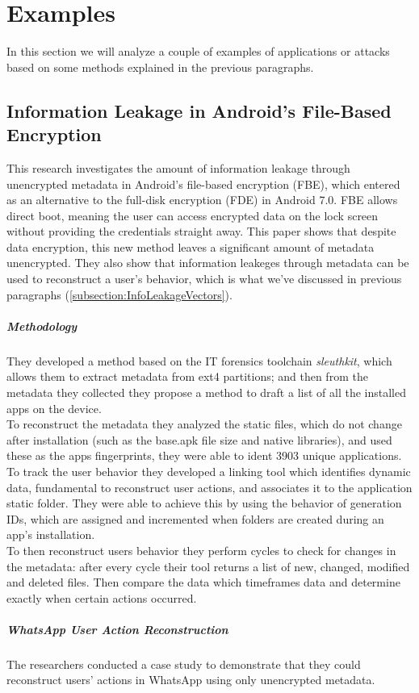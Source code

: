 \section{Examples}
In this section we will analyze a couple of examples of applications or attacks based on some methods explained in the previous paragraphs. 
\subsection{Information Leakage in Android's File-Based Encryption}
This research \cite{10.1145/3339252.3340340} investigates the amount of information leakage through unencrypted metadata in Android's file-based encryption (FBE), which entered as an alternative to the full-disk encryption (FDE) in Android 7.0. FBE allows direct boot, meaning the user can access encrypted data on the lock screen without providing the credentials straight away. 
This paper shows that despite data encryption, this new method leaves a significant amount of metadata unencrypted. They also show that information leakeges through metadata can be used to reconstruct a user's behavior, which is what we've discussed in previous paragraphs (\ref{subsection:InfoLeakageVectors}).
\subparagraph{Methodology} They developed a method based on the IT forensics toolchain \textit{sleuthkit}, which allows them to extract metadata from ext4 partitions; and then from the metadata they collected they propose a method to draft a list of all the installed apps on the device. 
\\To reconstruct the metadata they analyzed the static files, which do not change after installation (such as the base.apk file size and native libraries), and used these as the apps fingerprints, they were able to ident 3903 unique applications.
\\To track the user behavior they developed a linking tool which identifies dynamic data, fundamental to reconstruct user actions, and associates it to the application static folder. They were able to achieve this by using the behavior of generation IDs, which are assigned and incremented when folders are created during an app's installation. 
\\To then reconstruct users behavior they perform cycles to check for changes in the metadata: after every cycle their tool returns a list of new, changed, modified and deleted files. Then compare the data which timeframes data and determine exactly when certain actions occurred. 
\subparagraph{WhatsApp User Action Reconstruction} The researchers conducted a case study to demonstrate that they could reconstruct users' actions in WhatsApp using only unencrypted metadata. 
